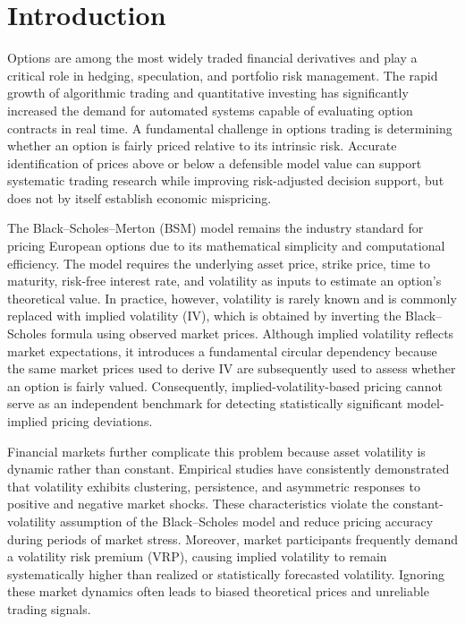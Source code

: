 \documentclass[journal]{IEEEtran}
\begin{document}
\IEEEpeerreviewmaketitle

\section{Introduction}

Options are among the most widely traded financial derivatives and play
a critical role in hedging, speculation, and portfolio risk management.
The rapid growth of algorithmic trading and quantitative investing has
significantly increased the demand for automated systems capable of
evaluating option contracts in real time. A fundamental challenge in
options trading is determining whether an option is fairly priced
relative to its intrinsic risk. Accurate identification of prices
above or below a defensible model value can support systematic trading
research while improving risk-adjusted decision support, but does not
by itself establish economic mispricing.

The Black--Scholes--Merton (BSM) model remains the industry standard
for pricing European options due to its mathematical simplicity and
computational efficiency. The model requires the underlying asset
price, strike price, time to maturity, risk-free interest rate, and
volatility as inputs to estimate an option's theoretical value. In
practice, however, volatility is rarely known and is commonly replaced
with implied volatility (IV), which is obtained by inverting the
Black--Scholes formula using observed market prices. Although implied
volatility reflects market expectations, it introduces a fundamental
circular dependency because the same market prices used to derive IV
are subsequently used to assess whether an option is fairly valued.
Consequently, implied-volatility-based pricing cannot serve as an
independent benchmark for detecting statistically significant
model-implied pricing deviations.

Financial markets further complicate this problem because asset
volatility is dynamic rather than constant. Empirical studies have
consistently demonstrated that volatility exhibits clustering,
persistence, and asymmetric responses to positive and negative market
shocks. These characteristics violate the constant-volatility
assumption of the Black--Scholes model and reduce pricing accuracy
during periods of market stress. Moreover, market participants
frequently demand a volatility risk premium (VRP), causing implied
volatility to remain systematically higher than realized or
statistically forecasted volatility. Ignoring these market dynamics
often leads to biased theoretical prices and unreliable trading
signals.
\end{document}
